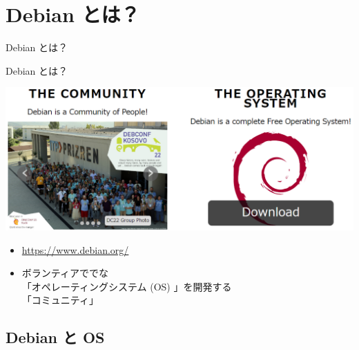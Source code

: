 
\section{Debian とは？}

\begin{frame}
  \begin{center}\Huge{Debian とは？}\end{center}
\end{frame}


\begin{frame}{Debian とは？}

\includegraphics[scale=0.35]{image202303/www-debian-org-2022.png}

\begin{itemize}
\item \url{https://www.debian.org/}
\item ボランティアで{\color{red}{フリー/オープン}}で{\color{red}{ユニバーサル}}な \\
「オペレーティングシステム (OS) 」を開発する\\
「コミュニティ」
\end{itemize}

\end{frame}


\subsection{Debian と OS}


